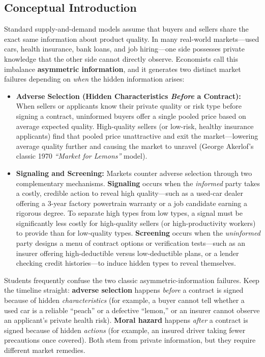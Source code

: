 \documentclass[11pt,letterpaper]{article}
\begin{document}
\subsection*{Conceptual Introduction}
Standard supply-and-demand models assume that buyers and sellers share the exact same information about product quality. In many real-world markets—used cars, health insurance, bank loans, and job hiring—one side possesses private knowledge that the other side cannot directly observe. Economists call this imbalance \textbf{asymmetric information}, and it generates two distinct market failures depending on \emph{when} the hidden information arises:
\begin{itemize}
    \item \textbf{Adverse Selection (Hidden Characteristics \emph{Before} a Contract):} When sellers or applicants know their private quality or risk type before signing a contract, uninformed buyers offer a single pooled price based on average expected quality. High-quality sellers (or low-risk, healthy insurance applicants) find that pooled price unattractive and exit the market—lowering average quality further and causing the market to unravel (George Akerlof's classic 1970 \emph{``Market for Lemons''} model).
    \item \textbf{Signaling and Screening:} Markets counter adverse selection through two complementary mechanisms. \textbf{Signaling} occurs when the \emph{informed} party takes a costly, credible action to reveal high quality—such as a used-car dealer offering a 3-year factory powertrain warranty or a job candidate earning a rigorous degree. To separate high types from low types, a signal must be significantly less costly for high-quality sellers (or high-productivity workers) to provide than for low-quality types. \textbf{Screening} occurs when the \emph{uninformed} party designs a menu of contract options or verification tests—such as an insurer offering high-deductible versus low-deductible plans, or a lender checking credit histories—to induce hidden types to reveal themselves.
\end{itemize}

\begin{tcolorbox}[colback=yellow!10!white,colframe=orange!80!black,title=\textbf{Clear It Up: Adverse Selection vs.\ Moral Hazard}]
Students frequently confuse the two classic asymmetric-information failures. Keep the timeline straight: \textbf{adverse selection} happens \emph{before} a contract is signed because of hidden \emph{characteristics} (for example, a buyer cannot tell whether a used car is a reliable ``peach'' or a defective ``lemon,'' or an insurer cannot observe an applicant's private health risk). \textbf{Moral hazard} happens \emph{after} a contract is signed because of hidden \emph{actions} (for example, an insured driver taking fewer precautions once covered). Both stem from private information, but they require different market remedies.
\end{tcolorbox}
\end{document}

